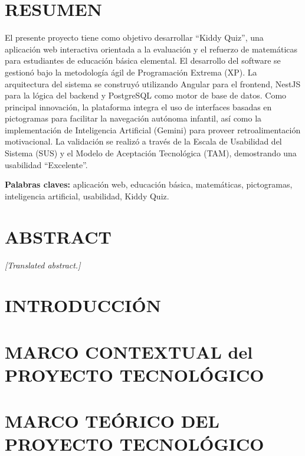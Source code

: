 \documentclass[12pt,a4paper]{report}
\begin{document}
\chapter*{RESUMEN}
El presente proyecto tiene como objetivo desarrollar ``Kiddy Quiz'', una aplicación web interactiva orientada a la evaluación y el refuerzo de matemáticas para estudiantes de educación básica elemental. El desarrollo del software se gestionó bajo la metodología ágil de Programación Extrema (XP). La arquitectura del sistema se construyó utilizando Angular para el frontend, NestJS para la lógica del backend y PostgreSQL como motor de base de datos. Como principal innovación, la plataforma integra el uso de interfaces basadas en pictogramas para facilitar la navegación autónoma infantil, así como la implementación de Inteligencia Artificial (Gemini) para proveer retroalimentación motivacional. La validación se realizó a través de la Escala de Usabilidad del Sistema (SUS) y el Modelo de Aceptación Tecnológica (TAM), demostrando una usabilidad ``Excelente''.

\textbf{Palabras claves:} aplicación web, educación básica, matemáticas, pictogramas, inteligencia artificial, usabilidad, Kiddy Quiz.

\chapter*{ABSTRACT}
\textit{[Translated abstract.]}

\tableofcontents
\listoftables
\listoffigures

\clearpage
{}
\setcounter{page}{1}


\chapter*{INTRODUCCIÓN}


\chapter{MARCO CONTEXTUAL del PROYECTO  TECNOLÓGICO}
\clearpage


\chapter{MARCO TEÓRICO DEL PROYECTO TECNOLÓGICO}
\clearpage

\end{document}
